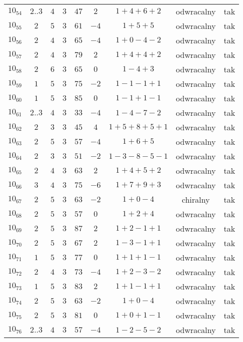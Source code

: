 \begin{longtable}{ccccccccc}
$10_{54}$ & $2..3$ & $4$ & $3$ & $47$ & $2$ & $1+4+6+2$ & odwracalny & tak \\
$10_{55}$ & $2$ & $5$ & $3$ & $61$ & $-4$ & $1+5+5$ & odwracalny & tak \\
$10_{56}$ & $2$ & $4$ & $3$ & $65$ & $-4$ & $1+0-4-2$ & odwracalny & tak \\
$10_{57}$ & $2$ & $4$ & $3$ & $79$ & $2$ & $1+4+4+2$ & odwracalny & tak \\
$10_{58}$ & $2$ & $6$ & $3$ & $65$ & $0$ & $1-4+3$ & odwracalny & tak \\
$10_{59}$ & $1$ & $5$ & $3$ & $75$ & $-2$ & $1-1-1+1$ & odwracalny & tak \\
$10_{60}$ & $1$ & $5$ & $3$ & $85$ & $0$ & $1-1+1-1$ & odwracalny & tak \\
$10_{61}$ & $2..3$ & $4$ & $3$ & $33$ & $-4$ & $1-4-7-2$ & odwracalny & tak \\
$10_{62}$ & $2$ & $3$ & $3$ & $45$ & $4$ & $1+5+8+5+1$ & odwracalny & tak \\
$10_{63}$ & $2$ & $5$ & $3$ & $57$ & $-4$ & $1+6+5$ & odwracalny & tak \\
$10_{64}$ & $2$ & $3$ & $3$ & $51$ & $-2$ & $1-3-8-5-1$ & odwracalny & tak \\
$10_{65}$ & $2$ & $4$ & $3$ & $63$ & $2$ & $1+4+5+2$ & odwracalny & tak \\
$10_{66}$ & $3$ & $4$ & $3$ & $75$ & $-6$ & $1+7+9+3$ & odwracalny & tak \\
$10_{67}$ & $2$ & $5$ & $3$ & $63$ & $-2$ & $1+0-4$ & chiralny & tak \\
$10_{68}$ & $2$ & $5$ & $3$ & $57$ & $0$ & $1+2+4$ & odwracalny & tak \\
$10_{69}$ & $2$ & $5$ & $3$ & $87$ & $2$ & $1+2-1+1$ & odwracalny & tak \\
$10_{70}$ & $2$ & $5$ & $3$ & $67$ & $2$ & $1-3-1+1$ & odwracalny & tak \\
$10_{71}$ & $1$ & $5$ & $3$ & $77$ & $0$ & $1+1+1-1$ & odwracalny & tak \\
$10_{72}$ & $2$ & $4$ & $3$ & $73$ & $-4$ & $1+2-3-2$ & odwracalny & tak \\
$10_{73}$ & $1$ & $5$ & $3$ & $83$ & $2$ & $1+1-1+1$ & odwracalny & tak \\
$10_{74}$ & $2$ & $5$ & $3$ & $63$ & $-2$ & $1+0-4$ & odwracalny & tak \\
$10_{75}$ & $2$ & $5$ & $3$ & $81$ & $0$ & $1+0+1-1$ & odwracalny & tak \\
$10_{76}$ & $2..3$ & $4$ & $3$ & $57$ & $-4$ & $1-2-5-2$ & odwracalny & tak \\

\end{longtable}

